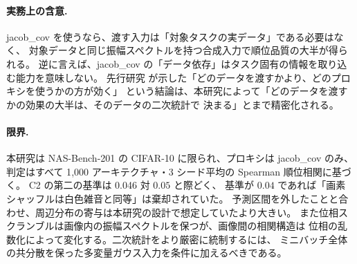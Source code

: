 \documentclass[11pt]{article}
\providecommand{\unverified}[1]{#1}
\begin{document}
\paragraph{実務上の含意.}
jacob\_cov を使うなら、渡す入力は「対象タスクの実データ」である必要はなく、
対象データと同じ振幅スペクトルを持つ合成入力で順位品質の大半が得られる。
逆に言えば、jacob\_cov の「データ依存」はタスク固有の情報を取り込む能力を意味しない。
先行研究 \cite{airas20260903zcproxy} が示した「どのデータを渡すかより、どのプロキシを使うかの方が効く」
という結論は、本研究によって「どのデータを渡すかの効果の大半は、そのデータの二次統計で
決まる」とまで精密化される。

\paragraph{限界.}
本研究は NAS-Bench-201 の CIFAR-10 に限られ、プロキシは jacob\_cov のみ、
判定はすべて 1{,}000 アーキテクチャ・3 シード平均の Spearman 順位相関に基づく。
C2 の第二の基準は \unverified{0.046} 対 $0.05$ と際どく、
基準が $0.04$ であれば「画素シャッフルは白色雑音と同等」は棄却されていた。
予測区間を外したことと合わせ、周辺分布の寄与は本研究の設計で想定していたより大きい。
また位相スクランブルは画像内の振幅スペクトルを保つが、画像間の相関構造は
位相の乱数化によって変化する。二次統計をより厳密に統制するには、
ミニバッチ全体の共分散を保った多変量ガウス入力を条件に加えるべきである。



\end{document}
